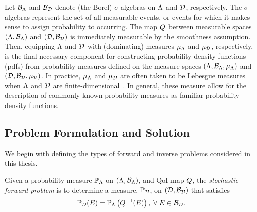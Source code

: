 Let $\mathcal{B}_{{\Lambda}}$ and $\mathcal{B}_{\mathcal{D}}$ denote (the Borel) $\sigma$-algebras on ${\Lambda}$ and $\mathcal{D}$, respectively.
The $\sigma$-algebras represent the set of all measurable events, or events for which it makes sense to assign probability to occurring.
The map $Q$ between measurable spaces $({\Lambda}, \mathcal{B}_{{\Lambda}})$ and $(\mathcal{D}, \mathcal{B}_{\mathcal{D}})$ is immediately measurable by the smoothness assumption.
Then, equipping ${\Lambda}$ and $\mathcal{D}$ with (dominating) measures $\mu_{{\Lambda}}$ and $\mu_{\mathcal{D}}$, respectively, is the final necessary component for constructing probability density functions (pdfs) from probability measures defined on the measure spaces $({\Lambda}, \mathcal{B}_{{\Lambda}}, \mu_{{\Lambda}})$ and $(\mathcal{D}, \mathcal{B}_{\mathcal{D}}, \mu_{\mathcal{D}})$.
In practice, $\mu_{{\Lambda}}$ and $\mu_{\mathcal{D}}$ are often taken to be Lebesgue measures when ${\Lambda}$ and $\mathcal{D}$ are finite-dimensional~\cite{BET+14, BJW18}.
In general, these measure allow for the description of commonly known probability measures as familiar probability density functions.

\subsection{Problem Formulation and Solution}
We begin with defining the types of forward and inverse problems considered in this thesis.

\begin{defn}\label{defn:forward-problem}
  Given a probability measure $\mathbb{P}_{\Lambda}$ on $({\Lambda}, \mathcal{B}_{{\Lambda}})$, and QoI map $Q$, the \emph{stochastic forward problem} is to determine a measure, $\mathbb{P}_{\mathcal{D}}$, on $(\mathcal{D}, \mathcal{B}_{\mathcal{D}})$ that satisfies
  \begin{equation}\label{eq:forward-problem}
    \mathbb{P}_{\mathcal{D}} (E) = \mathbb{P}_{\Lambda} \left ( Q^{-1}(E) \right ), \; \forall \; E \in \mathcal{B}_{\mathcal{D}}.
  \end{equation}
\end{defn}

